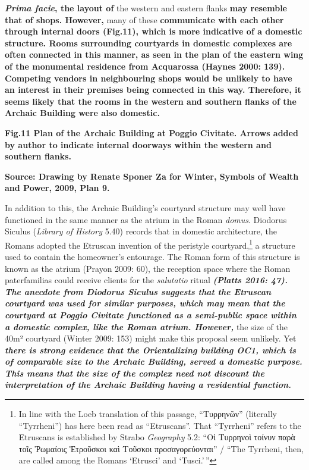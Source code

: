 \textbf{\emph{Prima facie}, the layout of} the western and eastern
flanks \textbf{may resemble that of shops. However,} many of these
\textbf{communicate with each other through internal doors (Fig.11),
which is more indicative of a domestic structure. Rooms surrounding
courtyards in domestic complexes are often connected in this manner, as
seen in the plan of the eastern wing of the monumental residence from
Acquarossa (Haynes 2000: 139). Competing vendors in neighbouring shops
would be unlikely to have an interest in their premises being connected
in this way. Therefore, it seems likely that the rooms in the western
and southern flanks of the Archaic Building were also domestic.}

\textbf{Fig.11 Plan of the Archaic Building at Poggio Civitate. Arrows
added by author to indicate internal doorways within the western and
southern flanks.}

\textbf{Source: Drawing by Renate Sponer Za for Winter, Symbols of
Wealth and Power, 2009, Plan 9.}

In addition to this, the Archaic Building's courtyard structure may well
have functioned in the same manner as the atrium in the Roman
\emph{domus}. Diodorus Siculus (\emph{Library of History} 5.40) records
that in domestic architecture, the Romans adopted the Etruscan invention
of the peristyle courtyard,\footnote{In line with the Loeb translation
  of this passage, ``Τυρρηνῶν'' (literally ``Tyrrheni'') has here been
  read as ``Etruscans''. That ``Tyrrheni'' refers to the Etruscans is
  established by Strabo \emph{Geography} 5.2: ``Οἱ Τυρρηνοὶ τοίνυν παρὰ
  τοῖς Ῥωμαίοις Ἑτροῦσκοι καὶ Τοῦσκοι προσαγορεύονται'' / ``The
  Tyrrheni, then, are called among the Romans `Etrusci' and `Tusci.'\,''}
a structure used to contain the homeowner's entourage. The Roman form of
this structure is known as the atrium (Prayon 2009: 60), the reception
space where the Roman paterfamilias could receive clients for the
\emph{salutatio} ritual \textbf{\emph{(Platts 2016: 47). The anecdote
from Diodorus Siculus suggests that the Etruscan courtyard was used for
similar purposes, which may mean that the courtyard at Poggio Civitate
functioned as a semi-public space within a domestic complex, like the
Roman atrium. However,}} the size of the 40m² courtyard (Winter 2009:
153) might make this proposal seem unlikely. Yet \textbf{\emph{there is
strong evidence that the Orientalizing building OC1, which is of
comparable size to the Archaic Building, served a domestic purpose. This
means that the size of the complex need not discount the interpretation
of the Archaic Building having a residential function.}}

